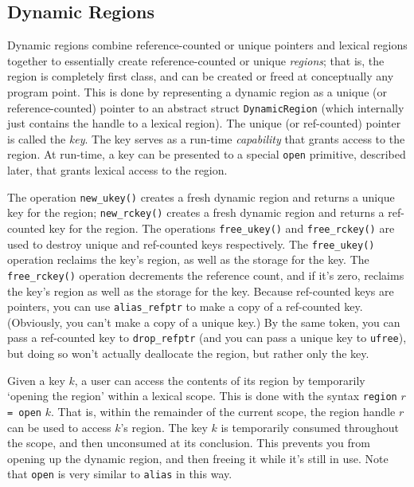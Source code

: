 \subsection{Dynamic Regions}
\label{sec:dynamic-regions}

Dynamic regions combine reference-counted or unique pointers and lexical
regions together to essentially create reference-counted or unique
\emph{regions}; that is, the region is completely first class, and can be
created or freed at conceptually any program point.  This is done by
representing a dynamic region as a unique (or reference-counted) pointer to
an abstract struct \texttt{DynamicRegion} (which internally just contains
the handle to a lexical region).  The unique (or ref-counted) pointer is
called the \emph{key}.  The key serves as a run-time \emph{capability} that
grants access to the region.  At run-time, a key can be presented to a
special \texttt{open} primitive, described later, that grants lexical access
to the region.
        
The operation \texttt{new\_ukey()} creates a fresh dynamic region and returns
a unique key for the region; \texttt{new\_rckey()} creates a fresh dynamic
region and returns a ref-counted key for the region.  The operations
\texttt{free\_ukey()} and \texttt{free\_rckey()} are used to destroy unique
and ref-counted keys respectively.  The \texttt{free\_ukey()} operation
reclaims the key's region, as well as the storage for the key.  The
\texttt{free\_rckey()} operation decrements the reference count, and if it's
zero, reclaims the key's region as well as the storage for the key.  Because
ref-counted keys are pointers, you can use \texttt{alias\_refptr} to make a
copy of a ref-counted key.  (Obviously, you can't make a copy of a unique
key.)  By the same token, you can pass a ref-counted key to
\texttt{drop\_refptr} (and you can pass a unique key to \texttt{ufree}), but
doing so won't actually deallocate the region, but rather only the key.

Given a key $k$, a user can access the contents of its region by temporarily
`opening the region' within a lexical scope.  This is done with the syntax
\verb+region+ $r$ \verb+= open+ $k$.  That is, within the remainder of the
current scope, the region handle $r$ can be used to access $k$'s region.
The key $k$ is temporarily consumed throughout the scope, and then
unconsumed at its conclusion.  This prevents you from opening up the dynamic
region, and then freeing it while it's still in use.  Note that
\texttt{open} is very similar to \texttt{alias} in this way.


